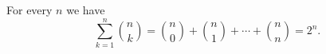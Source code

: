 

\setcounter{section}{3}
\setcounter{subsection}{1}
\setcounter{dfn}{1}

\begin{thm}
\label{thm:BinomSum}
For every $n$ we have
\begin{equation}
\label{eqn:SumBinCoeff}
\sum_{k=1}^n \binom{n}{k} = \binom{n}{0} + \binom{n}{1} + \cdots + \binom{n}{n} = 2^n.
\end{equation}
\end{thm}



